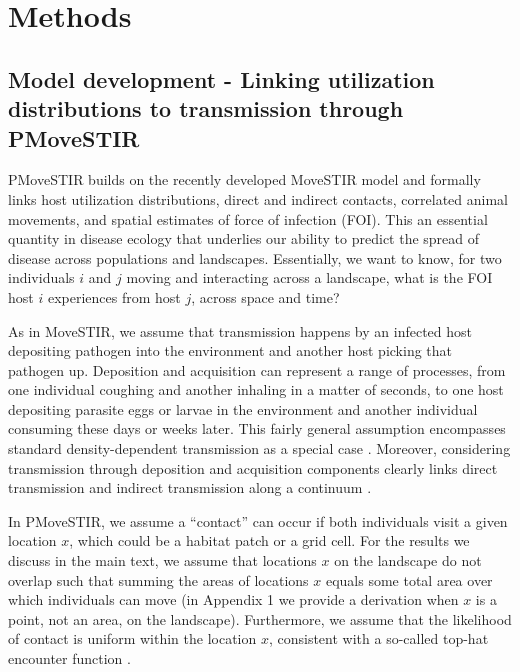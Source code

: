 \documentclass[letterpaper]{article}
\begin{document}
\section*{Methods}

\subsection*{Model development - Linking utilization distributions to transmission through PMoveSTIR}

PMoveSTIR builds on the recently developed MoveSTIR model \citep{Wilber2022} and formally links host utilization distributions, direct and indirect contacts, correlated animal movements, and spatial estimates of force of infection (FOI). This an essential quantity in disease ecology that underlies our ability to predict the spread of disease across populations and landscapes. Essentially, we want to know, for two individuals $i$ and $j$ moving and interacting across a landscape, what is the FOI host $i$ experiences from host $j$, across space and time?  

As in MoveSTIR, we assume that transmission happens by an infected host depositing pathogen into the environment and another host picking that pathogen up. 
Deposition and acquisition can represent a range of processes, from one individual coughing and another inhaling in a matter of seconds, to one host depositing parasite eggs or larvae in the environment and another individual consuming these days or weeks later. 
This fairly general assumption encompasses standard density-dependent transmission as a special case \citep{Cortez2021}. 
Moreover, considering transmission through deposition and acquisition components clearly links direct transmission and indirect transmission along a continuum \citep{Wilber2022}.

In PMoveSTIR, we assume a ``contact'' can occur if both individuals visit a given location $x$, which could be a habitat patch or a grid cell. 
For the results we discuss in the main text, we assume that locations $x$ on the landscape do not overlap such that summing the areas of locations $x$ equals some total area over which individuals can move (in Appendix 1 we provide a derivation when $x$ is a point, not an area, on the landscape). 
Furthermore, we assume that the likelihood of contact is uniform within the location $x$, consistent with a so-called top-hat encounter function \citep{Gurarie2013,Wilber2022}.
\end{document}
